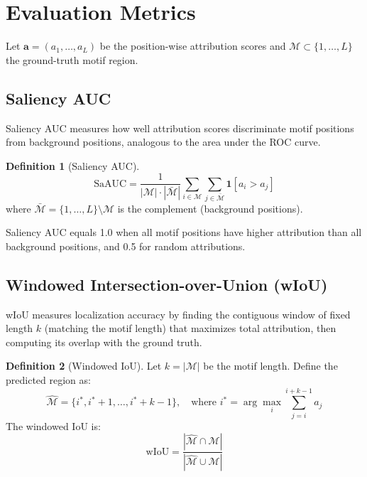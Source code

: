 \documentclass[11pt]{article}
\theoremstyle{definition}
\newtheorem{definition}{Definition}
\begin{document}
\section{Evaluation Metrics}

Let $\mathbf{a} = (a_1, \ldots, a_L)$ be the position-wise attribution scores and $\mathcal{M} \subset \{1, \ldots, L\}$ the ground-truth motif region.

\subsection{Saliency AUC}

Saliency AUC measures how well attribution scores discriminate motif positions from background positions, analogous to the area under the ROC curve.

\begin{definition}[Saliency AUC]
\begin{equation}
    \text{SaAUC} = \frac{1}{|\mathcal{M}| \cdot |\bar{\mathcal{M}}|} \sum_{i \in \mathcal{M}} \sum_{j \in \bar{\mathcal{M}}} \mathbf{1}[a_i > a_j]
\end{equation}
where $\bar{\mathcal{M}} = \{1, \ldots, L\} \setminus \mathcal{M}$ is the complement (background positions).
\end{definition}

Saliency AUC equals 1.0 when all motif positions have higher attribution than all background positions, and 0.5 for random attributions.

\subsection{Windowed Intersection-over-Union (wIoU)}

wIoU measures localization accuracy by finding the contiguous window of fixed length $k$ (matching the motif length) that maximizes total attribution, then computing its overlap with the ground truth.

\begin{definition}[Windowed IoU]
Let $k = |\mathcal{M}|$ be the motif length. Define the predicted region as:
\begin{equation}
    \hat{\mathcal{M}} = \{i^*, i^*+1, \ldots, i^*+k-1\}, \quad \text{where } i^* = \arg\max_{i} \sum_{j=i}^{i+k-1} a_j
\end{equation}
The windowed IoU is:
\begin{equation}
    \text{wIoU} = \frac{|\hat{\mathcal{M}} \cap \mathcal{M}|}{|\hat{\mathcal{M}} \cup \mathcal{M}|}
\end{equation}
\end{definition}
\end{document}

